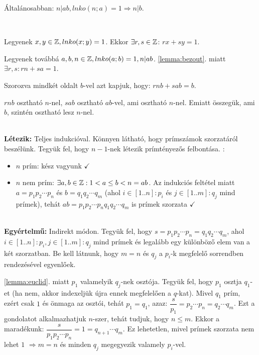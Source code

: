 \begin{proof4long}
\begin{lemma3}
Általánosabban: $n | ab, lnko(n; a) = 1 \Rightarrow n|b$.
\end{lemma3}\\[-1em]
\begin{proof4}[35.1pt]
Legyenek $x, y \in \mathbb{Z}, lnko(x; y) = 1$. Ekkor
$\exists r, s \in \mathbb{Z}$: $rx + sy = 1$.

Legyenek továbbá $a, b, n \in \mathbb{Z}, lnko(a; b) = 1, n | ab$.
\ref{lemma:bezout}. miatt $\exists r, s: rn + sa = 1$.

Szorozva mindkét oldalt $b$-vel azt kapjuk, hogy: $rnb + sab = b$.

$rnb$ osztható $n$-nel, $sab$ osztható $ab$-vel, ami osztható $n$-nel. Emiatt
összegük, ami $b$, szintén osztható lesz $n$-nel.
\end{proof4}\\
\textbf{Létezik:} Teljes indukcióval. Könnyen látható, hogy
 prímszámok szorzatáról beszélünk. Tegyük fel,
hogy $n-1$-nek létezik prímtényezős felbontása. :
\begin{itemize}
\item $n$ prím: kész vagyunk $\checkmark$
\item $n$ nem prím: $\exists a, b \in \mathbb{Z}: 1 < a \leq b < n = ab$. Az
indukciós feltétel miatt $a = p_1p_2\dotsm p_n$ és $b = q_1q_2\dotsm q_m$ (ahol
$i \in [1 .. n]: p_i$ és $j \in [1 ..m]: q_j$ mind prímek), tehát
$ab = p_1p_2\dotsm p_nq_1q_2\dotsm q_m$ is prímek szorzata $\checkmark$
\end{itemize}\\
\textbf{Egyértelmű:} Indirekt módon. Tegyük fel, hogy
$s = p_1p_2\dotsm p_n = q_1q_2\dotsm q_m$, ahol
$i \in [1 .. n]: p_i, j \in [1 .. m]: q_j$ mind prímek és legalább egy
különböző elem van a két szorzatban. Be kell látnunk, hogy $m = n$ és $q_j$ a
$p_i$-k megfelelő sorrendben rendezésével egyenlőek.

\ref{lemma:euclid}. miatt $p_1$ valamelyik $q_j$-nek osztója. Tegyük fel, hogy
$p_1$ osztja $q_1$-et (ha nem, akkor indexeljük újra ennek megfelelően a
$q$-kat). Mivel $q_1$ prím, ezért csak $1$ és önmaga az osztói, tehát
$p_1 = q_1$, azaz: $\dfrac{s}{p_1} = p_2\dotsm p_n = q_2\dotsm q_m$. Ezt a
gondolatot alkalmazhatjuk $n$-szer, tehát tudjuk, hogy $n \leq m$. Ekkor a
maradékunk: $\dfrac{s}{p_1p_2\dotsm p_n} = 1 = q_{n+1}\dotsm q_m$. Ez
lehetetlen, mivel prímek szorzata nem lehet $1$ \blitza $\Rightarrow m = n$ és
minden $q_j$ megegyezik valamely $p_i$-vel.

\end{proof4long}

